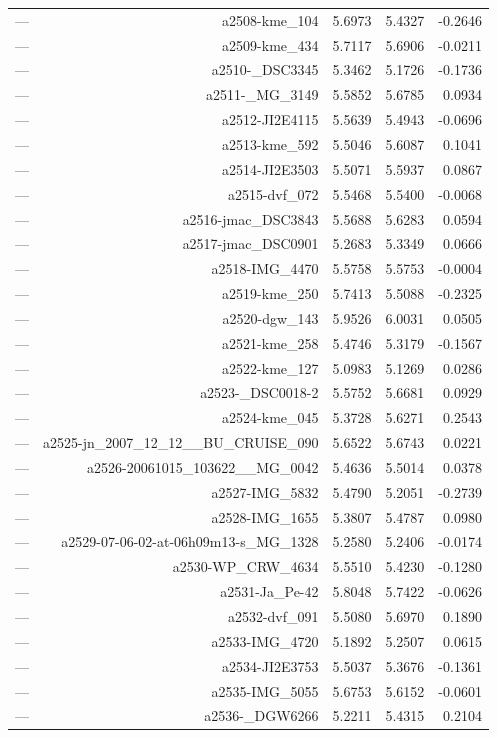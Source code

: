\begin{table}[htbp]
\begin{tabular}{lrrrr}
— & a2508-kme_104 & 5.6973 & 5.4327 & -0.2646 \\
— & a2509-kme_434 & 5.7117 & 5.6906 & -0.0211 \\
— & a2510-_DSC3345 & 5.3462 & 5.1726 & -0.1736 \\
— & a2511-_MG_3149 & 5.5852 & 5.6785 & 0.0934 \\
— & a2512-JI2E4115 & 5.5639 & 5.4943 & -0.0696 \\
— & a2513-kme_592 & 5.5046 & 5.6087 & 0.1041 \\
— & a2514-JI2E3503 & 5.5071 & 5.5937 & 0.0867 \\
— & a2515-dvf_072 & 5.5468 & 5.5400 & -0.0068 \\
— & a2516-jmac_DSC3843 & 5.5688 & 5.6283 & 0.0594 \\
— & a2517-jmac_DSC0901 & 5.2683 & 5.3349 & 0.0666 \\
— & a2518-IMG_4470 & 5.5758 & 5.5753 & -0.0004 \\
— & a2519-kme_250 & 5.7413 & 5.5088 & -0.2325 \\
— & a2520-dgw_143 & 5.9526 & 6.0031 & 0.0505 \\
— & a2521-kme_258 & 5.4746 & 5.3179 & -0.1567 \\
— & a2522-kme_127 & 5.0983 & 5.1269 & 0.0286 \\
— & a2523-_DSC0018-2 & 5.5752 & 5.6681 & 0.0929 \\
— & a2524-kme_045 & 5.3728 & 5.6271 & 0.2543 \\
— & a2525-jn_2007_12_12__BU_CRUISE_090 & 5.6522 & 5.6743 & 0.0221 \\
— & a2526-20061015_103622__MG_0042 & 5.4636 & 5.5014 & 0.0378 \\
— & a2527-IMG_5832 & 5.4790 & 5.2051 & -0.2739 \\
— & a2528-IMG_1655 & 5.3807 & 5.4787 & 0.0980 \\
— & a2529-07-06-02-at-06h09m13-s_MG_1328 & 5.2580 & 5.2406 & -0.0174 \\
— & a2530-WP_CRW_4634 & 5.5510 & 5.4230 & -0.1280 \\
— & a2531-Ja_Pe-42 & 5.8048 & 5.7422 & -0.0626 \\
— & a2532-dvf_091 & 5.5080 & 5.6970 & 0.1890 \\
— & a2533-IMG_4720 & 5.1892 & 5.2507 & 0.0615 \\
— & a2534-JI2E3753 & 5.5037 & 5.3676 & -0.1361 \\
— & a2535-IMG_5055 & 5.6753 & 5.6152 & -0.0601 \\
— & a2536-_DGW6266 & 5.2211 & 5.4315 & 0.2104 \\

\end{tabular}
\end{table}
